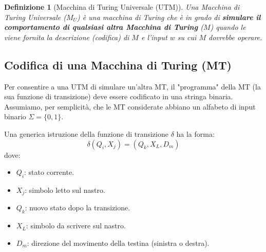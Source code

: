\documentclass[a4paper]{article}
\newtheorem{definition}{Definizione}
\begin{document}
\begin{definition}[Macchina di Turing Universale (UTM)]
Una Macchina di Turing Universale ($M_U$) è una macchina di Turing che è in grado di \textbf{simulare il comportamento di qualsiasi altra Macchina di Turing} ($M$) quando le viene fornita la descrizione (codifica) di $M$ e l'input $w$ su cui $M$ dovrebbe operare.
\end{definition}

\subsection{Codifica di una Macchina di Turing (MT)}

Per consentire a una UTM di simulare un'altra MT, il "programma" della MT (la sua funzione di transizione) deve essere codificato in una stringa binaria. Assumiamo, per semplicità, che le MT considerate abbiano un alfabeto di input binario $\Sigma = \{0,1\}$.

Una generica istruzione della funzione di transizione $\delta$ ha la forma:
\[ \delta(Q_i, X_j) = (Q_k, X_L, D_m) \]
dove:
\begin{itemize}
    \item $Q_i$: stato corrente.
    \item $X_j$: simbolo letto sul nastro.
    \item $Q_k$: nuovo stato dopo la transizione.
    \item $X_L$: simbolo da scrivere sul nastro.
    \item $D_m$: direzione del movimento della testina (sinistra o destra).
\end{itemize}
\end{document}
